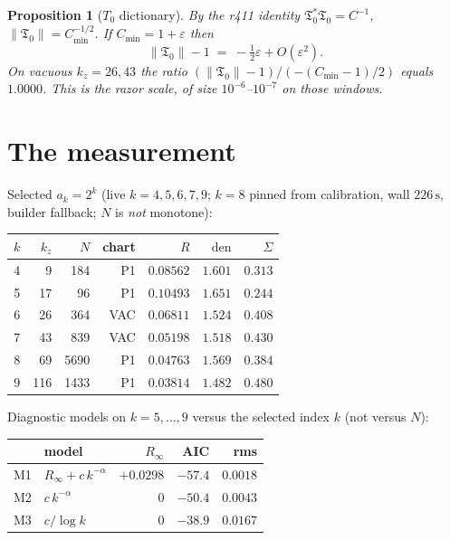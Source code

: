 \documentclass[11pt]{article}
\newtheorem{prop}{Proposition}
\theoremstyle{remark}
\newcommand{\Tfrak}{\mathfrak{T}}
\begin{document}
\begin{prop}[$T_0$ dictionary]\label{prop:T0}
By the r411 identity $\Tfrak_0^*\Tfrak_0=C^{-1}$,
$\|\Tfrak_0\|=C_{\min}^{-1/2}$.
If $C_{\min}=1+\varepsilon$ then
\begin{equation}\label{eq:T0}
\|\Tfrak_0\|-1
\;=\;
-\tfrac12\varepsilon+O(\varepsilon^2).
\end{equation}
On vacuous $k_z=26,43$ the ratio
$(\|\Tfrak_0\|-1)/(-(C_{\min}-1)/2)$ equals $1.0000$.
This is the razor scale, of size $10^{-6}$--$10^{-7}$
on those windows.
\end{prop}

\section{The measurement}\label{sec:meas}

Selected $a_k=2^k$ (live $k=4,5,6,7,9$;
$k=8$ pinned from calibration, wall $226\,\mathrm{s}$,
builder fallback; $N$ is \emph{not} monotone):

\begin{center}
\begin{tabular}{rrrrrrr}
\toprule
$k$ & $k_z$ & $N$ & chart & $R$ & $\mathrm{den}$ & $\Sigma$ \\
\midrule
4 & 9 & 184 & P1 & $0.08562$ & $1.601$ & $0.313$ \\
5 & 17 & 96 & P1 & $0.10493$ & $1.651$ & $0.244$ \\
6 & 26 & 364 & VAC & $0.06811$ & $1.524$ & $0.408$ \\
7 & 43 & 839 & VAC & $0.05198$ & $1.518$ & $0.430$ \\
8 & 69 & 5690 & P1 & $0.04763$ & $1.569$ & $0.384$ \\
9 & 116 & 1433 & P1 & $0.03814$ & $1.482$ & $0.480$ \\
\bottomrule
\end{tabular}
\end{center}

\noindent
Diagnostic models on $k=5,\ldots,9$ versus the
selected index $k$ (not versus $N$):

\begin{center}
\begin{tabular}{llrrr}
\toprule
 & model & $R_\infty$ & AIC & rms \\
\midrule
M1 & $R_\infty+c\,k^{-\alpha}$ & $+0.0298$ & $-57.4$ & $0.0018$ \\
M2 & $c\,k^{-\alpha}$ & $0$ & $-50.4$ & $0.0043$ \\
M3 & $c/\log k$ & $0$ & $-38.9$ & $0.0167$ \\
\bottomrule
\end{tabular}
\end{center}
\end{document}
